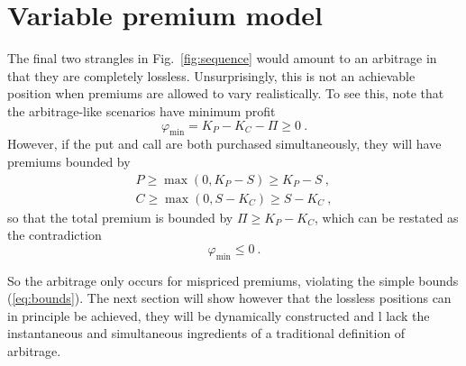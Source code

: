 \documentclass[aps,reprint]{revtex4-2}
\begin{document}
\section{Variable premium model}

The final two strangles in Fig.~\ref{fig:sequence} would amount to an arbitrage in that they are completely lossless.  Unsurprisingly, this is not an achievable position when premiums are allowed to vary realistically.  To see this, note that the arbitrage-like scenarios have minimum profit
\begin{equation}
\varphi_{\min} = K_P - K_C - \Pi \geq 0~.
\end{equation}
However, if the put and call are both purchased simultaneously, they will have premiums bounded by 
\begin{subequations} \label{eq:bounds}
\begin{align}
P \geq \max(0, K_P - S) \geq K_P - S~,\\
C \geq \max(0, S - K_C) \geq S - K_C~,
\end{align}
\end{subequations}
so that the total premium is bounded by $\Pi \geq K_P - K_C$, which can be restated as the contradiction
\begin{equation}
\varphi_{\min} \leq 0~.
\end{equation}

So the arbitrage only occurs for mispriced premiums, violating the simple bounds (\ref{eq:bounds}).  The next section will show however that the lossless positions can in principle be achieved, they will be dynamically constructed and l lack the instantaneous and simultaneous ingredients of a traditional definition of arbitrage.
\end{document}
